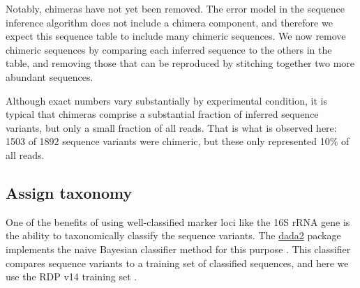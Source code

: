 \begin{knitrout}
\color{fgcolor}\begin{kframe}
\begin{alltt}
 \hlkwb{<-} \hlstd{(mergers[}\hlopt{!}\hlstd{(}\hlstd{,} \hlstd{(mergers))])}
\end{alltt}
\end{kframe}
\end{knitrout}

Notably, chimeras have not yet been removed. The error model in the
sequence inference algorithm does not include a chimera component, and
therefore we expect this sequence table to include many chimeric sequences. 
We now remove chimeric sequences by comparing each inferred sequence to the
others in the table, and removing those that can be reproduced by
stitching together two more abundant sequences.

\begin{knitrout}
\color{fgcolor}\begin{kframe}
\begin{alltt}
 \hlkwb{<-} 
\end{alltt}
\end{kframe}
\end{knitrout}

Although exact numbers vary substantially by experimental condition, it is
typical that chimeras comprise a substantial fraction of inferred sequence variants,
but only a small fraction of all reads. That is
what is observed here: 1503 of 1892 sequence variants were chimeric, but
these only represented 10\% of all reads.

\subsection*{Assign taxonomy}

One of the benefits of using well-classified marker loci like the 16S
rRNA gene is the ability to taxonomically classify the sequence
variants. The \href{http://bioconductor.org/packages/dada2}{dada2}
package implements the naive Bayesian classifier method for this
purpose \cite{wang2007naive}. This classifier compares sequence
variants to a training set of classified sequences, and here we use the
RDP v14 training set \cite{cole2009rdp}.

